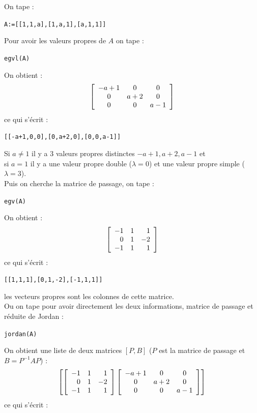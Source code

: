 \documentclass{article}
\begin{document}
\begin{giacjshere}
\begin{enumerate}
On tape :
\begin{center}
 {\tt A:=[[1,1,a],[1,a,1],[a,1,1]] }
\end{center}
Pour avoir les valeurs propres de $A$ on tape :
\begin{center}
{\tt egvl(A)}
\end{center}
On obtient :
$$ {\tt \left[ 
\begin{array}{ccc}
-a+1 & 0 & 0\\
0 & a+2 & 0\\
0 & 0 & a-1
\end{array}
\right] }$$
ce qui s'\'ecrit :
\begin{center}{\tt [[-a+1,0,0],[0,a+2,0],[0,0,a-1]]}\end{center}
Si $a \neq 1$ il y a 3 valeurs propres distinctes $-a+1,a+2,a-1$ et\\
 si $a=1$ il y a une valeur propre double ($\lambda=0$) et une valeur propre 
simple  ($\lambda=3$).\\
Puis on cherche la matrice de passage, on tape :
\begin{center}
{\tt egv(A)}
\end{center}
On obtient :
$$ {\tt \left[ 
\begin{array}{rrr}
-1 & 1 & 1\\
0 & 1 & -2\\
-1 & 1 & 1
\end{array}
\right] }$$
ce qui s'\'ecrit : 
\begin{center}
{\tt [[1,1,1],[0,1,-2],[-1,1,1]]}
\end{center}
les vecteurs propres sont les colonnes de cette matrice.\\
Ou on tape pour avoir directement les deux informations, matrice de passage et r\'eduite de Jordan :
\begin{center}
{\tt jordan(A)}
\end{center}
On obtient une liste de deux matrices $[P,B]$ ($P$ est la matrice de passage et
$B=P^{-1}AP$) :
$$ {\tt \left[ \left[ 
\begin{array}{rrr}
-1 & 1 & 1\\
0 & 1 & -2\\
-1 & 1 & 1
\end{array}
\right] 
\left[\begin{array}{ccc}
-a+1 & 0 & 0\\
0 & a+2 & 0\\
0 & 0 & a-1
\end{array}
\right] 
\right]}$$
ce qui s'\'ecrit :
\begin{center}

\end{center}
\end{enumerate}
\end{giacjshere}
\end{document}
